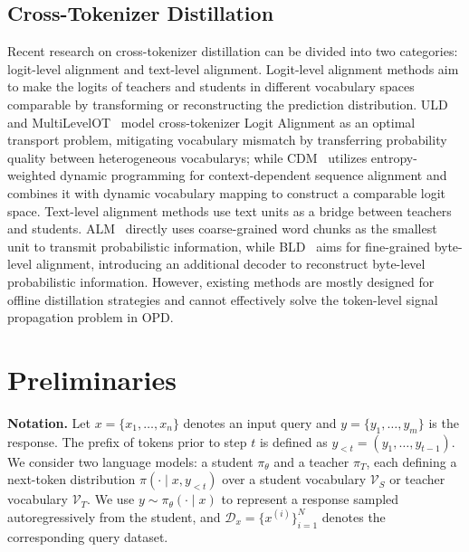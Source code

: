 \documentclass{article}
\theoremstyle{plain}
\theoremstyle{definition}
\theoremstyle{remark}
\begin{document}
\subsection{Cross-Tokenizer Distillation} Recent research on cross-tokenizer distillation can be divided into two categories: logit-level alignment and text-level alignment. Logit-level alignment methods aim to make the logits of teachers and students in different vocabulary spaces comparable by transforming or reconstructing the prediction distribution. ULD~\cite{boizard2025crosstokenizerdistillationuniversallogit} and MultiLevelOT~\cite{cui2025multileveloptimaltransportuniversal} model cross-tokenizer Logit Alignment as an optimal transport problem, mitigating vocabulary mismatch by transferring probability quality between heterogeneous vocabularys; while CDM~\cite{Li_2024} utilizes entropy-weighted dynamic programming for context-dependent sequence alignment and combines it with dynamic vocabulary mapping to construct a comparable logit space. Text-level alignment methods use text units as a bridge between teachers and students. ALM~\cite{minixhofer2025universalcrosstokenizerdistillationapproximate} directly uses coarse-grained word chunks as the smallest unit to transmit probabilistic information, while BLD~\cite{singh2026crosstokenizerllmdistillationbytelevel} aims for fine-grained byte-level alignment, introducing an additional decoder to reconstruct byte-level probabilistic information. However, existing methods are mostly designed for offline distillation strategies and cannot effectively solve the token-level signal propagation problem in OPD.



\section{Preliminaries} 

\textbf{Notation.}  Let $x = \{x_1, \ldots, x_n\}$ denotes an input query and $y = \{y_1, \ldots, y_m\}$ is the response. The prefix of tokens prior to step $t$ is defined as $y_{<t} = (y_1, \ldots, y_{t-1})$. We consider two language models: a student $\pi_\theta$
and a teacher $\pi_T$, each defining a next-token distribution
$\pi(\cdot \mid x, y_{<t})$ over a student vocabulary $\mathcal{V}_S$ or teacher vocabulary $\mathcal{V}_T$.
We use $y \sim \pi_\theta(\cdot \mid x)$ to represent a response
sampled autoregressively from the student,
and $\mathcal{D}_x =\{x^{(i)}\}_{i=1}^N$ denotes the corresponding query dataset. 
\end{document}
